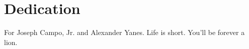 \chapter*{Dedication}
 For Joseph Campo, Jr. and Alexander Yanes. Life is short. You'll be forever a lion.
